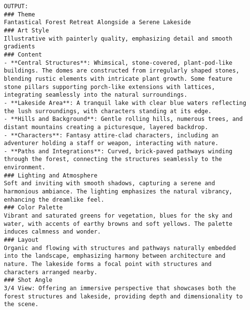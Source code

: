 \begin{lstlisting}
OUTPUT:
### Theme
Fantastical Forest Retreat Alongside a Serene Lakeside
### Art Style
Illustrative with painterly quality, emphasizing detail and smooth gradients
### Content
- **Central Structures**: Whimsical, stone-covered, plant-pod-like buildings. The domes are constructed from irregularly shaped stones, blending rustic elements with intricate plant growth. Some feature stone pillars supporting porch-like extensions with lattices, integrating seamlessly into the natural surroundings.
- **Lakeside Area**: A tranquil lake with clear blue waters reflecting the lush surroundings, with characters standing at its edge.
- **Hills and Background**: Gentle rolling hills, numerous trees, and distant mountains creating a picturesque, layered backdrop.
- **Characters**: Fantasy attire-clad characters, including an adventurer holding a staff or weapon, interacting with nature.
- **Paths and Integrations**: Curved, brick-paved pathways winding through the forest, connecting the structures seamlessly to the environment.
### Lighting and Atmosphere
Soft and inviting with smooth shadows, capturing a serene and harmonious ambiance. The lighting emphasizes the natural vibrancy, enhancing the dreamlike feel.
### Color Palette
Vibrant and saturated greens for vegetation, blues for the sky and water, with accents of earthy browns and soft yellows. The palette induces calmness and wonder.
### Layout
Organic and flowing with structures and pathways naturally embedded into the landscape, emphasizing harmony between architecture and nature. The lakeside forms a focal point with structures and characters arranged nearby.
### Shot Angle
3/4 View: Offering an immersive perspective that showcases both the forest structures and lakeside, providing depth and dimensionality to the scene.
\end{lstlisting}


